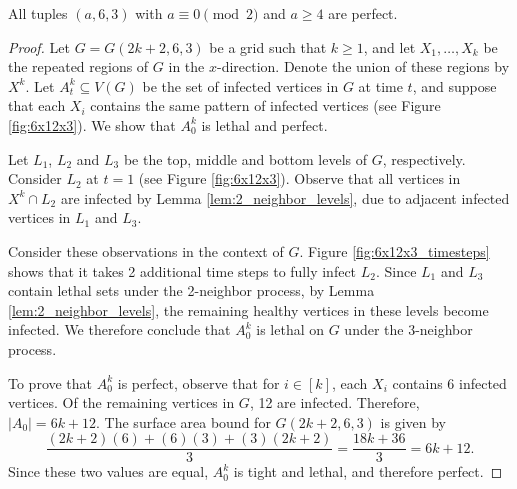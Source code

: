 \begin{con}
\label{con:3x6xeven}
All tuples $(a,6,3)$ with $a \equiv 0 \pmod 2$ and $a \geq 4$ are perfect. 
\end{con}

\begin{proof}
Let $G=G(2k+2,6,3)$ be a grid such that $k \geq 1$, and let $X_1, \dots, X_{k}$ be the repeated regions of $G$ in the $x$-direction. Denote the union of these regions by $X^k$. Let $A_t^k \subseteq V(G)$ be the set of infected vertices in $G$ at time $t$, and suppose that each $X_i$ contains the same pattern of infected vertices (see Figure \ref{fig:6x12x3}). We show that $A_0^k$ is lethal and perfect. 

Let $L_1$, $L_2$ and $L_3$ be the top, middle and bottom levels of $G$, respectively. Consider $L_2$ at $t=1$ (see Figure \ref{fig:6x12x3}). Observe that all vertices in $X^k \cap L_2$ are infected by Lemma \ref{lem:2_neighbor_levels}, due to adjacent infected vertices in $L_1$ and $L_3$. 

Consider these observations in the context of $G$. Figure \ref{fig:6x12x3_timesteps} shows that it takes 2 additional time steps to fully infect $L_2$. Since $L_1$ and $L_3$ contain lethal sets under the 2-neighbor process, by Lemma \ref{lem:2_neighbor_levels}, the remaining healthy vertices in these levels become infected. We therefore conclude that $A_0^k$ is lethal on $G$ under the 3-neighbor process.

To prove that $A_0^k$ is perfect, observe that for $i \in [k]$, each $X_i$ contains 6 infected vertices. Of the remaining vertices in $G$, 12 are infected. Therefore, $|A_0| = 6k+12$. The surface area bound for $G(2k+2,6,3)$ is given by
$$\frac{(2k+2)(6) + (6)(3) + (3)(2k+2)}{3} = \frac{18k + 36}{3} = 6k+12.$$
Since these two values are equal, $A_0^k$ is tight and lethal, and therefore perfect.
\end{proof}

